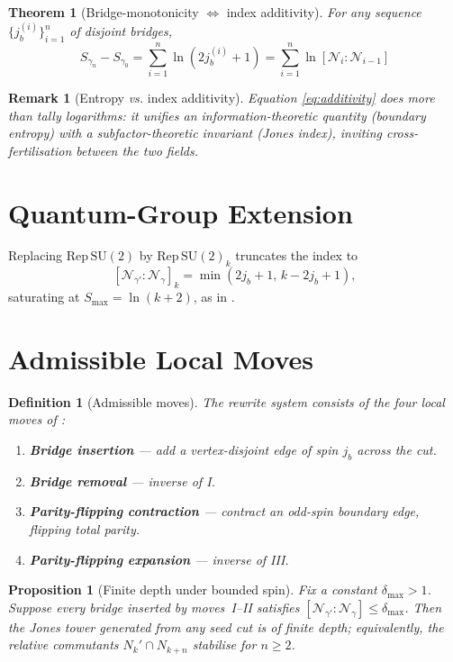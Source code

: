 \documentclass[11pt]{article}
\newtheorem{definition}{Definition}[section]
\newtheorem{theorem}{Theorem}[section]
\newtheorem{proposition}{Proposition}[section]
\newtheorem{remark}{Remark}[section]
\begin{document}
\begin{theorem}[Bridge-monotonicity $\Leftrightarrow$ index additivity]
For any sequence $\{j_b^{(i)}\}_{i=1}^{n}$ of disjoint bridges,
\[
  S_{\gamma_n}-S_{\gamma_0}
  =\sum_{i=1}^{n}\ln\!(2j_b^{(i)}+1)
  =\sum_{i=1}^{n}\ln[\mathcal N_i:\mathcal N_{i-1}]
  \tag{\thetheorem}\label{eq:additivity}
\]
\end{theorem}

\begin{remark}[Entropy \emph{vs.} index additivity]\label{rem:additivity}
Equation \eqref{eq:additivity} does more than tally logarithms:
it unifies an \emph{information-theoretic} quantity 
(boundary entropy) with a \emph{subfactor-theoretic} invariant 
(Jones index), inviting cross-fertilisation between the two fields.
\end{remark}

\section{Quantum-Group Extension}
Replacing $\mathrm{Rep}\,\mathrm{SU}(2)$ by $\mathrm{Rep}\,\mathrm{SU}(2)_k$
truncates the index to
\[
  [\mathcal N_{\gamma'}:\mathcal N_{\gamma}]_{k}
  =\min\!(2j_b+1,\,k-2j_b+1),
\]
saturating at $S_{\max}=\ln(k+2)$, as in \cite{EntropyMono}.

\section{Admissible Local Moves}

\begin{definition}[Admissible moves]\label{def:moves}
The rewrite system consists of the four local moves of \cite{EntropyMono}:
\begin{enumerate}
\item[\textbf{I.}] \textbf{Bridge insertion} — add a vertex-disjoint edge of spin
      $j_b$ across the cut.
\item[\textbf{II.}] \textbf{Bridge removal} — inverse of I.
\item[\textbf{III.}] \textbf{Parity-flipping contraction} — contract an odd-spin
      boundary edge, flipping total parity.
\item[\textbf{IV.}] \textbf{Parity-flipping expansion} — inverse of III.
\end{enumerate}
\end{definition}

\begin{proposition}[Finite depth under bounded spin]\label{prop:finitedepth}
Fix a constant $\delta_{\max}\!>\!1$.  
Suppose every bridge inserted by moves~I–II satisfies 
$[\mathcal N_{\gamma'}:\mathcal N_{\gamma}]\le \delta_{\max}$.  
Then the Jones tower generated from any seed cut is of finite depth; 
equivalently, the relative commutants 
$N_{k}'\!\cap N_{k+n}$ stabilise for $n\ge 2$.
\end{proposition}
\end{document}

